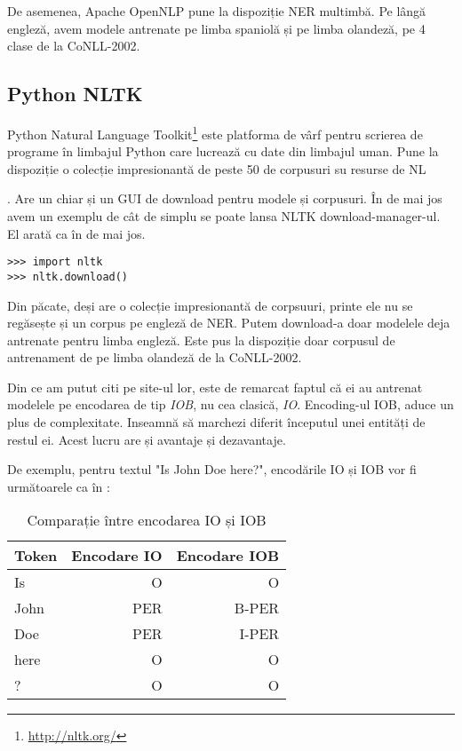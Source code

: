 De asemenea, Apache OpenNLP pune la dispoziție NER multimbă. Pe lângă engleză, avem modele antrenate pe limba spaniolă și pe limba olandeză, pe 4 clase de la CoNLL-2002.

\subsection{Python NLTK}

Python Natural Language Toolkit\footnote{\url{http://nltk.org/}} este platforma de vârf pentru scrierea de programe în limbajul Python care lucrează cu date din limbajul uman. Pune la dispoziție  o colecție impresionantă de peste 50 de corpusuri su resurse de NL{. Are un chiar și un GUI de download pentru modele și corpusuri. În  de mai jos avem un exemplu de cât de simplu se poate lansa NLTK download-manager-ul. El arată ca în  de mai jos.

\lstset{language=python,caption=Python NLTK,label=lst:python-nltk}
\begin{lstlisting}
>>> import nltk
>>> nltk.download()
\end{lstlisting}


Din păcate, deși are o colecție impresionantă de corpsuuri, printe ele nu se regăsește și un corpus pe engleză de NER. Putem download-a doar modelele deja antrenate pentru limba engleză. Este pus la dispoziție doar corpusul de antrenament de pe limba olandeză de la CoNLL-2002.

Din ce am putut citi pe site-ul lor, este de remarcat faptul că ei au antrenat modelele pe encodarea de tip \textit{IOB}, nu cea clasică, \textit{IO}. Encoding-ul IOB,  aduce un plus de complexitate. Inseamnă să marchezi diferit începutul unei entități de restul ei. Acest lucru are și avantaje și dezavantaje.


De exemplu, pentru textul "Is John Doe here?", encodările IO și IOB vor fi următoarele ca în :


\begin{center}
\begin{table}[hb]
\caption{Comparație între encodarea IO și IOB}
\begin{tabular}{ |l | r | r |}
\hline
  Token & Encodare IO & Encodare IOB \\
\hline
  Is & O & O \\
  John & PER & B-PER  \\
  Doe & PER & I-PER \\
  here & O & O \\
  ? & O & O \\
  \hline
\end{tabular}
 \label{table:iob-encoding}
\end{table}
\end{center}


}
